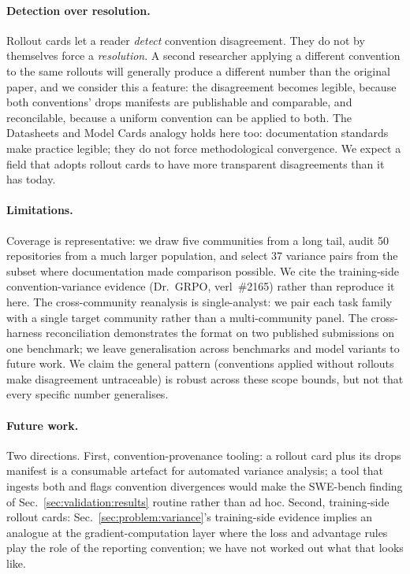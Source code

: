 \documentclass{article}
\begin{document}
\paragraph{Detection over resolution.} Rollout cards let a
reader \emph{detect} convention disagreement. They do not by
themselves force a \emph{resolution}. A second researcher
applying a different convention to the same rollouts will
generally produce a different number than the original paper,
and we consider this a feature: the disagreement becomes
legible, because both conventions' drops manifests are
publishable and comparable, and reconcilable, because a
uniform convention can be applied to both. The Datasheets and
Model Cards analogy holds here too: documentation standards
make practice legible; they do not force methodological
convergence. We expect a field that adopts rollout cards to
have more transparent disagreements than it has today.

\paragraph{Limitations.} Coverage is representative: we draw
five communities from a long tail, audit 50 repositories from
a much larger population, and select 37 variance pairs from
the subset where documentation made comparison possible. We
cite the training-side convention-variance evidence
(Dr.~GRPO, verl~\#2165) rather than reproduce it here. The
cross-community reanalysis is single-analyst: we pair each
task family with a single target community rather than a
multi-community panel. The cross-harness reconciliation
demonstrates the format on two published submissions on one
benchmark; we leave generalisation across benchmarks and model
variants to future work.
We claim the general pattern (conventions applied without
rollouts make disagreement untraceable) is robust across
these scope bounds, but not that every specific number
generalises.

\paragraph{Future work.} Two directions. First,
convention-provenance tooling: a rollout card plus its drops
manifest is a consumable artefact for automated variance
analysis; a tool that ingests both and flags convention
divergences would make the SWE-bench finding of
Sec.~\ref{sec:validation:results} routine rather than ad hoc.
Second, training-side rollout cards:
Sec.~\ref{sec:problem:variance}'s training-side evidence
implies an analogue at the gradient-computation layer where
the loss and advantage rules play the role of the reporting
convention; we have not worked out what that looks like.
\end{document}
